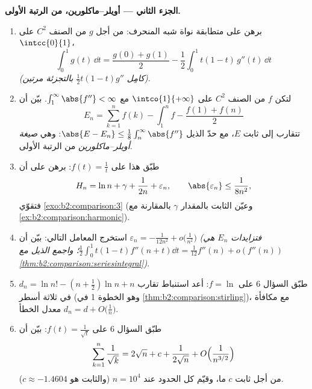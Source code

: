 \begin{problem}
\medskip
\noindent\textbf{الجزء الثاني --- أويلر--ماكلورين، من الرتبة الأولى.}
\begin{enumerate}[resume]
  \item برهن على متطابقة نواة شبه المنحرف: من أجل $g$ من الصنف
        $C^2$ على $\intcc{0}{1}$،
        \[
        \int_0^1 g(t)\,\dd t = \frac{g(0) + g(1)}{2}
        - \frac12\int_0^1 t(1 - t)\,g''(t)\,\dd t
        \]
        \emph{(كامِل $\frac12 t(1-t)g''$ بالتجزئة مرتين)}.
  \item لتكن $f$ من الصنف $C^2$ على $\intco{1}{+\infty}$ مع
        $\int_1^\infty \abs{f''} < \infty$. بيّن أن
        \[
        E_n = \sum_{k=1}^{n} f(k) - \int_1^n f -
        \frac{f(1) + f(n)}{2}
        \]
        تتقارب إلى ثابت $E$، مع حدّ الذيل
        $\abs{E - E_n} \leq \frac18\int_n^\infty\abs{f''}$: وهي
        \emph{صيغة أويلر--ماكلورين} من الرتبة الأولى.
  \item طبّق هذا على $f(t) = \frac1t$: برهن على أن
        \[
        H_n = \ln n + \gamma + \frac{1}{2n} + \varepsilon_n,
        \qquad \abs{\varepsilon_n} \leq \frac{1}{8n^2},
        \]
        فتقوّي \cref{exo:b2:comparison:3} (وعيّن
        الثابت بالمقدار $\gamma$ بالمقارنة مع
        \cref{ex:b2:comparison:harmonic}).
  \item استخرج المعامل التالي: بيّن أن $\varepsilon_n =
        -\frac{1}{12n^2} + o\bigl(\frac1{n^2}\bigr)$
        \emph{(فتزايدات $E_n$ هي
        $\frac12\int_0^1t(1-t)f''(n+t)\dd t =
        \frac1{12}f''(n) + o(f''(n))$؛ واجمع الذيل مع
        \cref{thm:b2:comparison:seriesintegral})}.
  \item طبّق السؤال 6 على $f = \ln$: أعد استنباط تقارب
        $d_n = \ln n! - (n +
        \frac12)\ln n + n$ في ثلاثة أسطر (وهو الخطوة 1 في
        \cref{thm:b2:comparison:stirling})، مع مكافأة معدل
        الخطأ $d_n = d + O\bigl(\frac1n\bigr)$.
  \item طبّق السؤال 6 على $f(t) = \frac{1}{\sqrt t}$: بيّن أن
        \[
        \sum_{k=1}^{n}\frac1{\sqrt k} = 2\sqrt n + c +
        \frac{1}{2\sqrt n} + O\Bigl(\frac{1}{n^{3/2}}\Bigr)
        \]
        من أجل ثابت $c$ ما، وقيّم كل الحدود عند $n =
        10^4$ (والثابت هو $c \approx -1.4604$).
\end{enumerate}


\end{problem}

